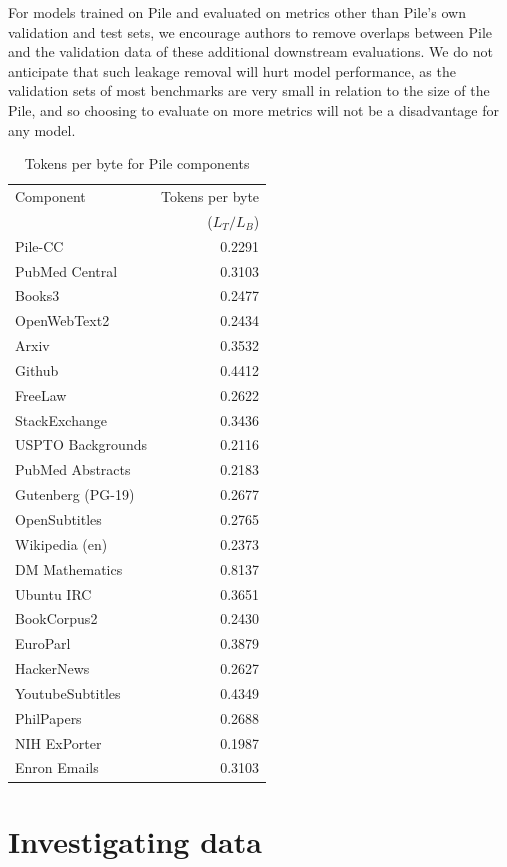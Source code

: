 \documentclass[11pt,a4paper]{article}
\begin{document}
\begin{appendices}
For models trained on Pile and evaluated on metrics other than Pile's own validation and test sets, we encourage authors to remove overlaps between Pile and the validation data of these additional downstream evaluations. We do not anticipate that such leakage removal will hurt model performance, as the validation sets of most benchmarks are very small in relation to the size of the Pile, and so choosing to evaluate on more metrics will not be a disadvantage for any model.

\begin{table}[t]

    \centering
    \begin{tabular}{l r}
    \toprule
        Component & Tokens per byte \\ & ($L_T/L_B$)
        \\
        \midrule
Pile-CC & 0.2291 \\
PubMed Central & 0.3103 \\
Books3 & 0.2477 \\
OpenWebText2 & 0.2434 \\
Arxiv & 0.3532 \\
Github & 0.4412 \\
FreeLaw & 0.2622 \\
StackExchange & 0.3436 \\
USPTO Backgrounds & 0.2116 \\
PubMed Abstracts & 0.2183 \\
Gutenberg (PG-19) & 0.2677 \\
OpenSubtitles & 0.2765 \\
Wikipedia (en) & 0.2373 \\
DM Mathematics & 0.8137 \\
Ubuntu IRC & 0.3651 \\
BookCorpus2 & 0.2430 \\
EuroParl & 0.3879 \\
HackerNews & 0.2627 \\
YoutubeSubtitles & 0.4349 \\
PhilPapers & 0.2688 \\
NIH ExPorter & 0.1987 \\
Enron Emails & 0.3103 \\
        \bottomrule
    \end{tabular}

\caption{Tokens per byte for Pile components}
\label{tbl:bpb_conversion}
\end{table}

\section{Investigating data}

\end{appendices}
\end{document}

